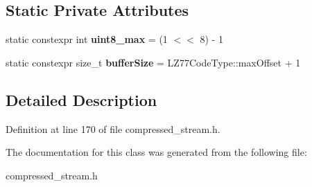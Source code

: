 \subsection*{Static Private Attributes}
\begin{DoxyCompactItemize}
\item 
\hypertarget{classCompressWriter_ace86be05e5886cfd42f77a5091c06b7a}{static constexpr int {\bfseries uint8\+\_\+max} = (1 $<$$<$ 8) -\/ 1}\label{classCompressWriter_ace86be05e5886cfd42f77a5091c06b7a}

\item 
\hypertarget{classCompressWriter_a96d2b6c2db5e69b996be1fefa7f337cb}{static constexpr size\+\_\+t {\bfseries buffer\+Size} = L\+Z77\+Code\+Type\+::max\+Offset + 1}\label{classCompressWriter_a96d2b6c2db5e69b996be1fefa7f337cb}

\end{DoxyCompactItemize}


\subsection{Detailed Description}


Definition at line 170 of file compressed\+\_\+stream.\+h.



The documentation for this class was generated from the following file\+:\begin{DoxyCompactItemize}
\item 
compressed\+\_\+stream.\+h\end{DoxyCompactItemize}
